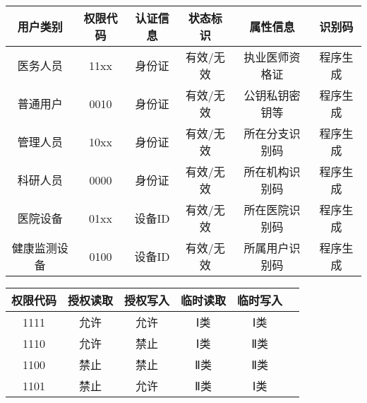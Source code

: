 \documentclass[UTF8]{ctexart}
\begin{document}
    \begin{center}
    \begin{tabular}{cccccc}
        \hline
        用户类别& 权限代码& 认证信息& 状态标识& 属性信息& 识别码\\
        \hline
        医务人员& 11xx& 身份证& 有效/无效& 执业医师资格证& 程序生成\\
        普通用户& 0010& 身份证& 有效/无效& 公钥私钥密钥等& 程序生成\\
        管理人员& 10xx& 身份证& 有效/无效& 所在分支识别码& 程序生成\\
        科研人员& 0000& 身份证& 有效/无效& 所在机构识别码& 程序生成\\
        医院设备& 01xx& 设备ID& 有效/无效& 所在医院识别码& 程序生成\\
        健康监测设备& 0100& 设备ID& 有效/无效& 所属用户识别码& 程序生成\\
        \hline
    \end{tabular}
    \end{center}
    
    \begin{center}
    \begin{tabular}{cccccc}
        \hline
        权限代码& 授权读取& 授权写入& 临时读取& 临时写入\\
        \hline
        1111& 允许& 允许& Ⅰ类& Ⅰ类\\
        1110& 允许& 禁止& Ⅰ类& Ⅱ类\\
        1100& 禁止& 禁止& Ⅱ类& Ⅱ类\\
        1101& 禁止& 允许& Ⅱ类& Ⅰ类\\
        \hline
    \end{tabular}
    \end{center}
\end{document}
